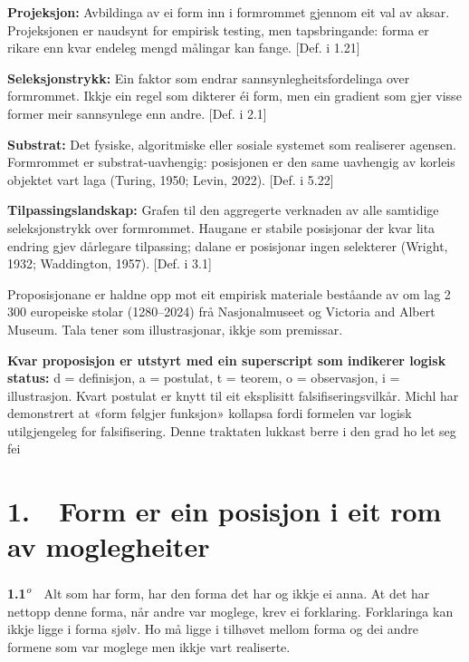 \documentclass[10pt]{article}
\begin{document}
\textbf{Projeksjon:} Avbildinga av ei form inn i formrommet gjennom eit val av aksar. Projeksjonen er naudsynt for empirisk testing, men tapsbringande: forma er rikare enn kvar endeleg mengd målingar kan fange. [Def. i 1.21]




\textbf{Seleksjonstrykk:} Ein faktor som endrar sannsynlegheitsfordelinga over formrommet. Ikkje ein regel som dikterer éi form, men ein gradient som gjer visse former meir sannsynlege enn andre. [Def. i 2.1]




\textbf{Substrat:} Det fysiske, algoritmiske eller sosiale systemet som realiserer agensen. Formrommet er substrat-uavhengig: posisjonen er den same uavhengig av korleis objektet vart laga (Turing, 1950; Levin, 2022). [Def. i 5.22]




\textbf{Tilpassingslandskap:} Grafen til den aggregerte verknaden av alle samtidige seleksjonstrykk over formrommet. Haugane er stabile posisjonar der kvar lita endring gjev dårlegare tilpassing; dalane er posisjonar ingen selekterer (Wright, 1932; Waddington, 1957). [Def. i 3.1]


Proposisjonane er haldne opp mot eit empirisk materiale beståande av om lag 2 300 europeiske stolar (1280–2024) frå Nasjonalmuseet og Victoria and Albert Museum. Tala tener som illustrasjonar, ikkje som premissar.



\textbf{Kvar proposisjon er utstyrt med ein superscript som indikerer logisk status:} d = definisjon, a = postulat, t = teorem, o = observasjon, i = illustrasjon. Kvart postulat er knytt til eit eksplisitt falsifiseringsvilkår. Michl har demonstrert at «form følgjer funksjon» kollapsa fordi formelen var logisk utilgjengeleg for falsifisering. Denne traktaten lukkast berre i den grad ho let seg fei




\mainmatter





\chapter*{1.~~Form er ein posisjon i eit rom av moglegheiter}




\noindent\textbf{1.1}\textsuperscript{\textit{o}}~~Alt som har form, har den forma det har og ikkje ei anna. At det har nettopp denne forma, når andre var moglege, krev ei forklaring. Forklaringa kan ikkje ligge i forma sjølv. Ho må ligge i tilhøvet mellom forma og dei andre formene som var moglege men ikkje vart realiserte.
\end{document}
